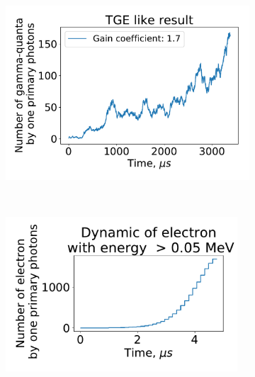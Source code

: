 \documentclass[utf8]{webofc}
\begin{document}
\begin{figure}[ht!]
	\begin{subfigure}[b]{0.5\textwidth}
		\includegraphics[width=0.95\linewidth]{figures/proofTGE.pdf}
		\caption{}
		\label{pic-tge-a}
	\end{subfigure}
	~
	\begin{subfigure}[b]{0.5\textwidth}
		\includegraphics[width=0.95\textwidth]{figures/kotlinElectron.pdf}
		\caption{}
		\label{pic-electron-b}
	\end{subfigure}
	\caption{}
\end{figure}
\end{document}
